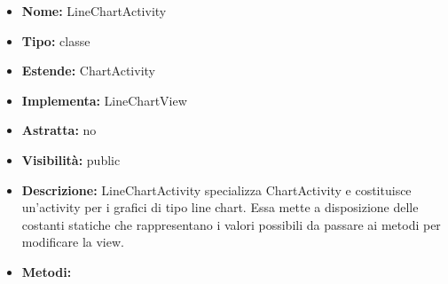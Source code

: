 			
			\begin{itemize}
			\item \textbf{Nome:} LineChartActivity
			\item \textbf{Tipo:} classe
			
		\item \textbf{Estende:}
		ChartActivity
		\item \textbf{Implementa:}
		LineChartView
		\item \textbf{Astratta:}
		no
			\item \textbf{Visibilità:} public
			\item \textbf{Descrizione:} LineChartActivity specializza ChartActivity e costituisce un'activity per i grafici di tipo line chart. Essa mette a disposizione delle costanti statiche che rappresentano i valori possibili da passare ai metodi per modificare la view.
			\item \textbf{Metodi:}
				\begin{itemize}
				\setlength{\itemsep}{5pt}
				

\end{itemize}
\end{itemize}
